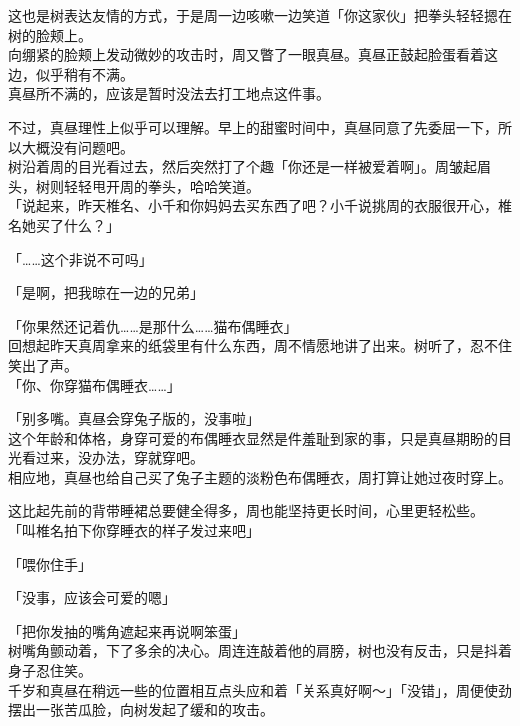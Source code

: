 这也是树表达友情的方式，于是周一边咳嗽一边笑道「你这家伙」把拳头轻轻摁在树的脸颊上。\\

向绷紧的脸颊上发动微妙的攻击时，周又瞥了一眼真昼。真昼正鼓起脸蛋看着这边，似乎稍有不满。\\

真昼所不满的，应该是暂时没法去打工地点这件事。

不过，真昼理性上似乎可以理解。早上的甜蜜时间中，真昼同意了先委屈一下，所以大概没有问题吧。\\

树沿着周的目光看过去，然后突然打了个趣「你还是一样被爱着啊」。周皱起眉头，树则轻轻甩开周的拳头，哈哈笑道。\\

「说起来，昨天椎名、小千和你妈妈去买东西了吧？小千说挑周的衣服很开心，椎名她买了什么？」

「……这个非说不可吗」

「是啊，把我晾在一边的兄弟」

「你果然还记着仇……是那什么……猫布偶睡衣」\\

回想起昨天真周拿来的纸袋里有什么东西，周不情愿地讲了出来。树听了，忍不住笑出了声。\\

「你、你穿猫布偶睡衣……」

「别多嘴。真昼会穿兔子版的，没事啦」\\

这个年龄和体格，身穿可爱的布偶睡衣显然是件羞耻到家的事，只是真昼期盼的目光看过来，没办法，穿就穿吧。\\

相应地，真昼也给自己买了兔子主题的淡粉色布偶睡衣，周打算让她过夜时穿上。

这比起先前的背带睡裙总要健全得多，周也能坚持更长时间，心里更轻松些。\\

「叫椎名拍下你穿睡衣的样子发过来吧」

「喂你住手」

「没事，应该会可爱的嗯」

「把你发抽的嘴角遮起来再说啊笨蛋」\\

树嘴角颤动着，下了多余的决心。周连连敲着他的肩膀，树也没有反击，只是抖着身子忍住笑。\\

千岁和真昼在稍远一些的位置相互点头应和着「关系真好啊～」「没错」，周便使劲摆出一张苦瓜脸，向树发起了缓和的攻击。
